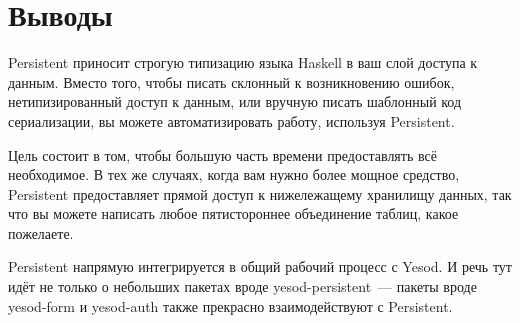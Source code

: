 \section{Выводы} %

Persistent приносит строгую типизацию языка Haskell в ваш слой доступа к данным. Вместо того, чтобы писать склонный к возникновению ошибок, нетипизированный доступ к данным, или вручную писать шаблонный код сериализации, вы можете автоматизировать работу, используя Persistent.

Цель состоит в том, чтобы большую часть времени предоставлять всё необходимое. В тех же случаях, когда вам нужно более мощное средство, Persistent предоставляет прямой доступ к нижележащему хранилищу данных, так что вы можете написать любое пятистороннее объединение таблиц, какое пожелаете.

Persistent напрямую интегрируется в общий рабочий процесс с Yesod. И речь тут идёт не только о небольших пакетах вроде yesod-persistent~--- пакеты вроде yesod-form и yesod-auth также прекрасно взаимодействуют с Persistent.  %
